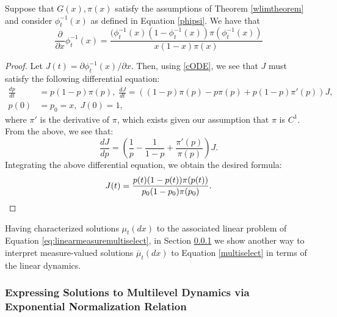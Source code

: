\documentclass[11pt]{article}
\numberwithin{equation}{section}
\newcommand{\ol}{\overline}
\newcommand{\paren}[1]{\left(#1\right)}
\newcommand{\D}[2]{\frac{d#1}{d#2}}
\newcommand{\PD}[2]{\frac{\partial#1}{\partial#2}}
\begin{document}
{\begin{lemma} \label{lem:phitinvformula}
Suppose that $G(x), \pi(x)$ satisfy the assumptions of Theorem \ref{wlimtheorem} and consider $\phi_t^{-1}(x)$ as defined in Equation \eqref{phipsi}. We have that
\begin{equation}\label{Jacobian}
\PD{}{x}\phi_t^{-1}(x)=\frac{(\phi_t^{-1}(x)(1-\phi_t^{-1}(x))\pi(\phi_t^{-1}(x))}{x(1-x)\pi(x)}
\end{equation}
\end{lemma}
\begin{proof}
Let $J(t)=\partial \phi_t^{-1}(x)/\partial x$. Then, using \eqref{cODE}, we see that $J$ must satisfy the following
differential equation:
\begin{equation}
\begin{split}
\D{p}{t}&=p(1-p)\pi(p), \; \D{J}{t}=\paren{(1-p)\pi(p)-p\pi(p)+p(1-p)\pi'(p)}J,\\
p(0)&=p_0=x, \; J(0)=1,
\end{split}
\end{equation}
where $\pi'$ is the derivative of $\pi$, which exists given our assumption that $\pi$ is $C^1$.
From the above, we see that:
\begin{equation}
\D{J}{p}=\paren{\frac{1}{p}-\frac{1}{1-p}+\frac{\pi'(p)}{\pi(p)}}J.
\end{equation}
Integrating the above differential equation, we obtain the desired formula:
\begin{equation}
J(t)=\frac{p(t)(1-p(t))\pi(p(t))}{p_0(1-p_0)\pi(p_0)}. \qedhere
\end{equation}
\end{proof}

Having characterized solutions $\mu_t(dx)$ to the associated linear problem of Equation \eqref{eq:linearmeasuremultiselect}, in Section \ref{sec:exponentialnormalization} we show another way to interpret measure-valued solutions $\ol{\mu}_t(dx)$ to Equation \eqref{multiselect} in terms of the linear dynamics.

\subsubsection{Expressing Solutions to Multilevel Dynamics via Exponential Normalization Relation}
\label{sec:exponentialnormalization}

}
\end{document}
